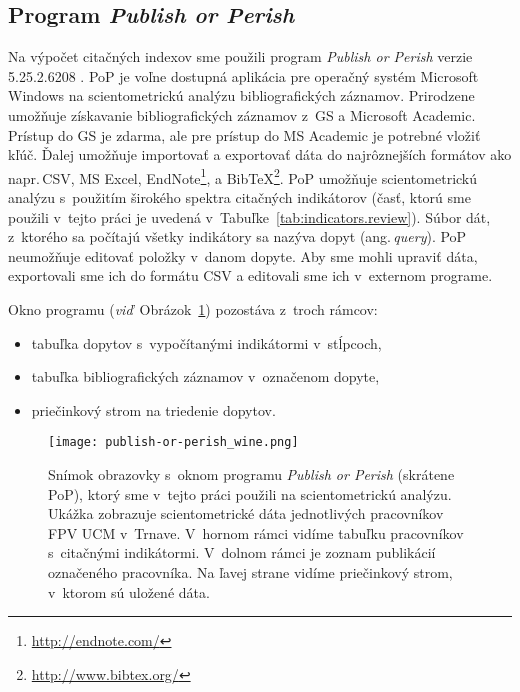 \subsection{Program \emph{Publish or Perish}}
\label{sec:pop}

Na výpočet citačných indexov sme použili program \emph{Publish or Perish} verzie
5.25.2.6208 \citep{Harzing2011}.  PoP je voľne dostupná aplikácia pre operačný
systém Microsoft Windows na scientometrickú analýzu bibliografických záznamov.
Prirodzene umožňuje získavanie bibliografických záznamov z~GS a Microsoft
Academic.  Prístup do GS je zdarma, ale pre prístup do MS Academic je potrebné
vložiť kľúč.  Ďalej umožňuje importovať a exportovať dáta do najrôznejších
formátov ako napr.\,CSV, MS Excel, EndNote\footnote{\url{http://endnote.com/}},
a BibTeX\footnote{\url{http://www.bibtex.org/}}.  PoP umožňuje scientometrickú
analýzu s~použitím širokého spektra citačných indikátorov (časť, ktorú sme
použili v~tejto práci je uvedená v~Tabuľke~\ref{tab:indicators.review}).  Súbor
dát, z~ktorého sa počítajú všetky indikátory sa nazýva dopyt
(ang.\,\emph{query}).  PoP neumožňuje editovať položky v~danom dopyte.  Aby sme
mohli upraviť dáta, exportovali sme ich do formátu CSV a editovali sme ich
v~externom programe.

Okno programu (\emph{viď}~Obrázok~\ref{fig:pop.screenshot}) pozostáva z~troch
rámcov:
\begin{itemize}
\item tabuľka dopytov s~vypočítanými indikátormi v~stĺpcoch,
\item tabuľka bibliografických záznamov v~označenom dopyte,
\item priečinkový strom na triedenie dopytov.
\end{itemize}

\begin{figure}
  \centering
  \texttt{[image: publish-or-perish\_wine.png]}
  \caption[Snímok obrazovky s~oknom programu \emph{Publish or Perish}]%
  {Snímok obrazovky s~oknom programu \emph{Publish or Perish} (skrátene PoP),
    ktorý sme v~tejto práci použili na scientometrickú analýzu.  Ukážka
    zobrazuje scientometrické dáta jednotlivých pracovníkov FPV UCM
    v~Trnave.  V~hornom rámci vidíme tabuľku pracovníkov s~citačnými
    indikátormi.  V~dolnom rámci je zoznam publikácií označeného pracovníka.  Na
    ľavej strane vidíme priečinkový strom, v~ktorom sú uložené dáta.}
  \label{fig:pop.screenshot}
\end{figure}


